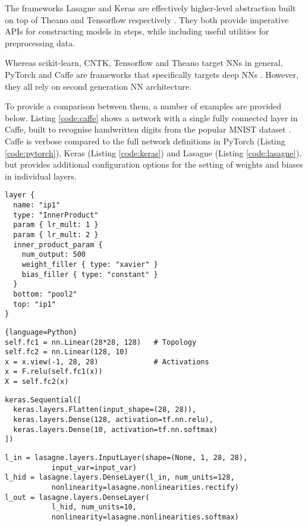 \documentclass[report.tex]{subfiles}
\begin{document}
The frameworks Lasagne and Keras are effectively higher-level abstraction
built on top of Theano and Tensorflow respectively \cite{Lasagne2018, Keras2018}.
They both provide imperative \gls{API}s for constructing models in steps, while
including useful utilities for preprocessing data.

Whereas scikit-learn, CNTK, Tensorflow and Theano target \glspl{NN} in general,
PyTorch and Caffe are frameworks that specifically targets deep \glspl{NN}
\cite{PyTorch2018, Caffe2018}.
However, they all rely on second generation \gls{NN} architecture.

To provide a comparison between them, a number of examples are provided below.
Listing \ref{code:caffe} shows a network with a single fully connected
layer in Caffe, built to recognise handwritten digits from the 
popular MNIST dataset \cite{LeCun1998}.
Caffe is verbose compared to the full network definitions in PyTorch 
(Listing \ref{code:pytorch}), Keras (Listing \ref{code:keras}) and
Lasagne (Listing \ref{code:lasagne}), but provides additional 
configuration options for the setting of weights and biases in 
individual layers.

\begin{lstlisting}
layer {
  name: "ip1"
  type: "InnerProduct"
  param { lr_mult: 1 }
  param { lr_mult: 2 }
  inner_product_param {
    num_output: 500
    weight_filler { type: "xavier" }
    bias_filler { type: "constant" }
  }
  bottom: "pool2"
  top: "ip1"
}
\end{lstlisting}

\begin{lstlisting}{language=Python}
self.fc1 = nn.Linear(28*28, 128)   # Topology
self.fc2 = nn.Linear(128, 10)
x = x.view(-1, 28, 28)             # Activations
x = F.relu(self.fc1(x))
X = self.fc2(x)
\end{lstlisting}

\begin{lstlisting}
keras.Sequential([
  keras.layers.Flatten(input_shape=(28, 28)),
  keras.layers.Dense(128, activation=tf.nn.relu),
  keras.layers.Dense(10, activation=tf.nn.softmax)
])
\end{lstlisting}

\begin{lstlisting}
l_in = lasagne.layers.InputLayer(shape=(None, 1, 28, 28),
           input_var=input_var)
l_hid = lasagne.layers.DenseLayer(l_in, num_units=128,
           nonlinearity=lasagne.nonlinearities.rectify)
l_out = lasagne.layers.DenseLayer(
           l_hid, num_units=10,
           nonlinearity=lasagne.nonlinearities.softmax)
\end{lstlisting}
\end{document}
